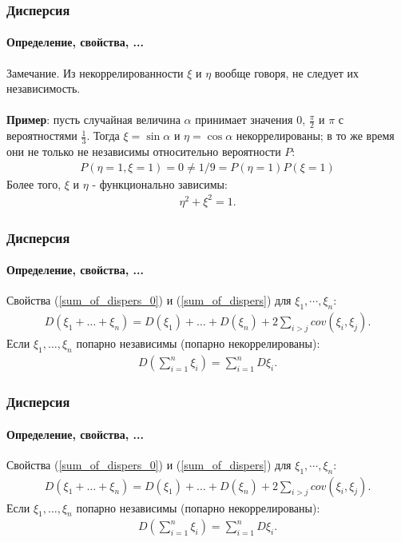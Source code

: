 \begin{frame}
\frametitle{Дисперсия}
\framesubtitle{Определение, свойства, ...}
\textbf{}{Замечание.}
Из некоррелированности $\xi$ и  $\eta$ вообще говоря, не следует их независимость.
\\
\\
\textbf{Пример}:  пусть случайная величина $\alpha$ принимает значения $0$, $\frac{\pi}{2}$ и $\pi$ с вероятностями $\frac{1}{3}$. Тогда $\xi=\sin \alpha$ и $\eta =\cos \alpha$
некоррелированы; в то же время они не только не независимы относительно вероятности $P$:
\begin{eqnarray*}
P(\eta =1, \xi=1) = 0 \neq  1/9 = P(\eta =1) P(\xi=1)
\end{eqnarray*}
Более того, $\xi$ и  $\eta$ - функционально зависимы: 
\begin{eqnarray*}
\eta ^ 2 + \xi ^ 2 = 1.
\end{eqnarray*}
\end{frame}

\begin{frame}
\frametitle{Дисперсия}
\framesubtitle{Определение, свойства, ...}
Свойства (\ref{sum_of_dispers_0}) и (\ref{sum_of_dispers}) для $\xi_1, \cdots, \xi_n$:
\begin{eqnarray}
\boxed{
    D(\xi_1 + \dots + \xi_n) = D(\xi_1) + \dots + D (\xi_n) + 2 \sum_{i>j} cov (\xi_i , \xi_j).
    }
\end{eqnarray}
\pause
Если $\xi_1, \dots, \xi_n$ попарно независимы (попарно некоррелированы):
\begin{eqnarray}\label{sum_of_dispers}
\boxed{
D \left(\sum_{i=1}^n  \xi_i \right)= \sum_{i=1}^n D\xi_i.
}
\end{eqnarray}
\end{frame}

\begin{frame}
\frametitle{Дисперсия}
\framesubtitle{Определение, свойства, ...}
Свойства (\ref{sum_of_dispers_0}) и (\ref{sum_of_dispers}) для $\xi_1, \cdots, \xi_n$:
\begin{eqnarray}
\boxed{
    D(\xi_1 + \dots + \xi_n) = D(\xi_1) + \dots + D (\xi_n) + 2 \sum_{i>j} cov (\xi_i , \xi_j).
    }
\end{eqnarray}
\pause
Если $\xi_1, \dots, \xi_n$ попарно независимы (попарно некоррелированы):
\begin{eqnarray}\label{sum_of_dispers}
\boxed{
D \left(\sum_{i=1}^n  \xi_i \right)= \sum_{i=1}^n D\xi_i.
}
\end{eqnarray}
\end{frame}


